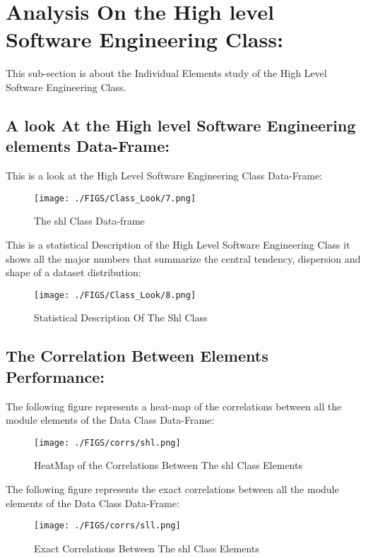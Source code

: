 \documentclass[12pt]{extreport}
\begin{document}
\section{Analysis On the High level Software Engineering  Class:}
This sub-section is about the Individual Elements study of the High Level Software Engineering Class. 

\subsection{A look At the High level Software Engineering elements Data-Frame:}


This is a look at the High Level Software Engineering Class Data-Frame:

\begin{figure}[H]
	\centering
	\texttt{[image: ./FIGS/Class\_Look/7.png]}
	\caption{The shl Class Data-frame}
	\label{fig:40}
\end{figure}

This is a statistical Description of the High Level Software Engineering Class it shows all the major numbers that summarize the central tendency, dispersion and shape of a dataset distribution:

\begin{figure}[H]
	\centering
	\texttt{[image: ./FIGS/Class\_Look/8.png]}
	\caption{Statistical Description Of The Shl Class}
	\label{fig:41}
\end{figure}

\subsection{The Correlation Between Elements Performance:}

The following figure represents a heat-map of the correlations between all the module elements of the Data Class Data-Frame:

\begin{figure}[H]
	\centering
	\texttt{[image: ./FIGS/corrs/shl.png]}
	\caption{HeatMap of the Correlations Between The shl Class Elements}
	\label{fig:42}
\end{figure}

The following figure represents the exact correlations between all the module elements of the Data Class Data-Frame:

\begin{figure}[H]
	\centering
	\texttt{[image: ./FIGS/corrs/sll.png]}
	\caption{Exact Correlations Between The shl Class Elements}
	\label{fig:43}
\end{figure}
\end{document}
